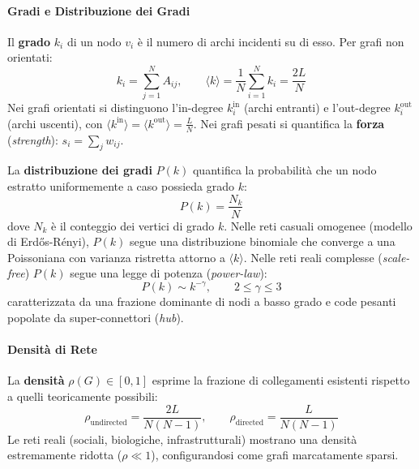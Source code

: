 \paragraph{Gradi e Distribuzione dei Gradi}
Il \textbf{grado} $k_i$ di un nodo $v_i$ è il numero di archi incidenti su di esso. Per grafi non orientati:
\begin{equation}
    k_i = \sum_{j=1}^N A_{ij}, \qquad \langle k \rangle = \frac{1}{N} \sum_{i=1}^N k_i = \frac{2L}{N}
\end{equation}
Nei grafi orientati si distinguono l'in-degree $k_i^{\text{in}}$ (archi entranti) e l'out-degree $k_i^{\text{out}}$ (archi uscenti), con $\langle k^{\text{in}} \rangle = \langle k^{\text{out}} \rangle = \frac{L}{N}$. Nei grafi pesati si quantifica la \textbf{forza} (\textit{strength}): $s_i = \sum_{j} w_{ij}$.

La \textbf{distribuzione dei gradi} $P(k)$ quantifica la probabilità che un nodo estratto uniformemente a caso possieda grado $k$:
\begin{equation}
    P(k) = \frac{N_k}{N}
\end{equation}
dove $N_k$ è il conteggio dei vertici di grado $k$. Nelle reti casuali omogenee (modello di Erd\H{o}s-R{\'e}nyi), $P(k)$ segue una distribuzione binomiale che converge a una Poissoniana con varianza ristretta attorno a $\langle k \rangle$. Nelle reti reali complesse (\textit{scale-free}) $P(k)$ segue una legge di potenza (\textit{power-law}):
\begin{equation}
    P(k) \sim k^{-\gamma}, \qquad 2 \le \gamma \le 3
\end{equation}
caratterizzata da una frazione dominante di nodi a basso grado e code pesanti popolate da super-connettori (\textit{hub}).

\paragraph{Densità di Rete}
La \textbf{densità} $\rho(G) \in [0, 1]$ esprime la frazione di collegamenti esistenti rispetto a quelli teoricamente possibili:
\begin{equation}
    \rho_{\text{undirected}} = \frac{2L}{N(N-1)}, \qquad \rho_{\text{directed}} = \frac{L}{N(N-1)}
\end{equation}
Le reti reali (sociali, biologiche, infrastrutturali) mostrano una densità estremamente ridotta ($\rho \ll 1$), configurandosi come grafi marcatamente sparsi.

